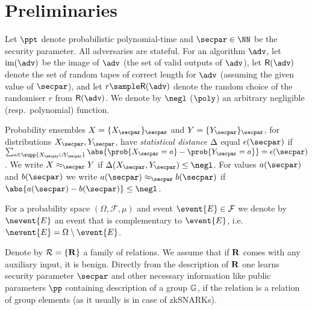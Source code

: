 \documentclass[runningheads,11pt]{llncs}
\begin{document}


\section{Preliminaries}
\label{sec:preliminaries}
Let $\ppt$ denote probabilistic polynomial-time and $\secpar \in \NN$ be the
security parameter. All adversaries are stateful. For an algorithm $\adv$, let
$\image (\adv)$ be the image of $\adv$ (the set of valid outputs of $\adv$), let
$\RND{\adv}$ denote the set of random tapes of correct length for $\adv$
(assuming the given value of $\secpar$), and let $r \sample \RND{\adv}$ denote
the random choice of the randomiser $r$ from $\RND{\adv}$. We denote by $\negl$
($\poly$) an arbitrary negligible (resp.~polynomial) function.

Probability ensembles $X = \smallset{X_\secpar}_\secpar$ and $Y =
\smallset{Y_\secpar}_\secpar$, for distributions $X_\secpar, Y_\secpar$, have
\emph{statistical distance} $\Delta$ equal $\epsilon(\secpar)$ if $\sum_{a \in
  \supp{X_\secpar \cup Y_\secpar}} \abs{\prob{X_\secpar = a} - \prob{Y_\secpar =
    a}} = \epsilon(\secpar)$. We write $X \approx_\secpar Y$ if $\SD(X_\secpar,
Y_\secpar) \leq \negl$. For values $a(\secpar)$ and $b(\secpar)$ we write
$a(\secpar) \approx_\secpar b(\secpar)$ if $\abs{a(\secpar) - b(\secpar)} \leq
\negl$.

\newcommand{\samplespace}{\Omega}
\newcommand{\eventspace}{\mathcal{F}}
\newcommand{\probfunction}{\mu}

For a probability space $(\samplespace, \eventspace, \probfunction)$ and event
$\event{E} \in \eventspace$ we denote by $\nevent{E}$ an event that is
complementary to $\event{E}$,
i.e.~$\nevent{E} = \samplespace \setminus \event{E}$.

Denote by $\mathcal{R} = \{\mathbf{R}\}$ a family of relations. We assume that if
$\mathbf{R}$ comes with any auxiliary input, it is benign. Directly from the
description of $\mathbf{R}$ one learns security parameter $\secpar$ and other
necessary information like public parameters $\pp$ containing description of a
group $\mathbb{G}$, if the relation is a relation of group elements (as it usually is
in case of zkSNARKs).
\end{document}
